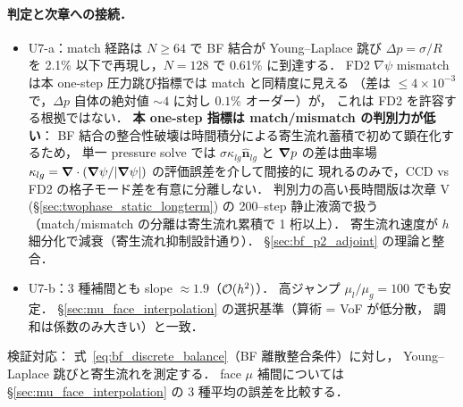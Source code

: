 \paragraph{判定と次章への接続．}
\begin{itemize}\setlength{\itemsep}{0pt}
  \item U7-a：match 経路は $N \ge 64$ で BF 結合が Young--Laplace 跳び $\Delta p = \sigma/R$ を
        2.1\% 以下で再現し，$N=128$ で 0.61\% に到達する．
        FD2 $\nabla\psi$ mismatch は本 one-step 圧力跳び指標では match と同精度に見える
        （差は $\le 4\times 10^{-3}$ で，$\Delta p$ 自体の絶対値 $\sim 4$ に対し $0.1\%$ オーダー）が，
        これは FD2 を許容する根拠ではない．
        \textbf{本 one-step 指標は match/mismatch の判別力が低い}：
        BF 結合の整合性破壊は時間積分による寄生流れ蓄積で初めて顕在化するため，
        単一 pressure solve では $\sigma\kappa_{lg}\hat{\bm n}_{lg}$ と $\bm{\nabla} p$ の差は曲率場
        $\kappa_{lg} = \bm{\nabla}\cdot(\bm{\nabla}\psi/|\bm{\nabla}\psi|)$ の評価誤差を介して間接的に
        現れるのみで，CCD vs FD2 の格子モード差を有意に分離しない．
        判別力の高い長時間版は次章 V (§\ref{sec:twophase_static_longterm}) の
        200--step 静止液滴で扱う（match/mismatch の分離は寄生流れ累積で 1 桁以上）．
        寄生流れ速度が $h$ 細分化で減衰（寄生流れ抑制設計通り）．
        §\ref{sec:bf_p2_adjoint} の理論と整合．\checkmark
  \item U7-b：3 種補間とも slope $\approx 1.9$（$\mathcal{O}(h^2)$）．
        高ジャンプ $\mu_l/\mu_g = 100$ でも安定．
        §\ref{sec:mu_face_interpolation} の選択基準（算術 = VoF が低分散，
        調和は係数のみ大きい）と一致．\checkmark
\end{itemize}
検証対応：
式~\eqref{eq:bf_discrete_balance}（BF 離散整合条件）に対し，
Young--Laplace 跳びと寄生流れを測定する．
face $\mu$ 補間については §\ref{sec:mu_face_interpolation} の 3 種平均の誤差を比較する．

\FloatBarrier
